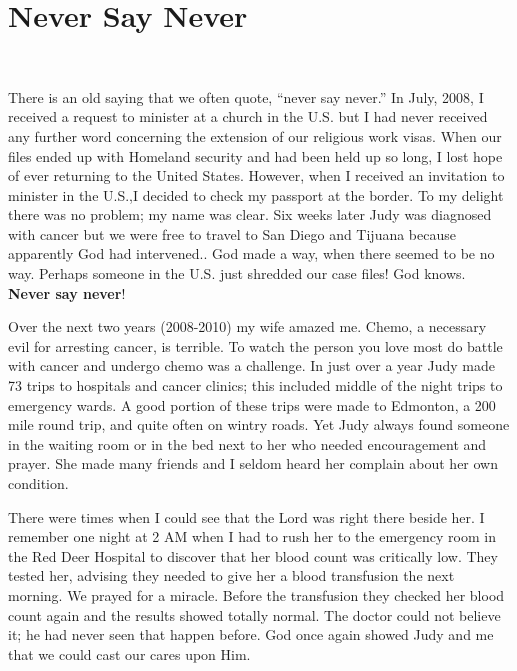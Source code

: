 \documentclass[twoside, 12pt]{book}
\begin{document}
\section{Never Say Never}
\

There is an old saying that we often quote, “never say never.” In July, 2008, I received a request to minister at a church in the U.S. but I had never received any further word concerning the extension of our religious work visas. When our files ended up with Homeland security and had been held up so long, I lost hope of ever returning to the United States. However, when I received an invitation to minister in the U.S.,I decided to check my passport at the border. To my delight there was no problem; my name was clear. Six weeks later Judy was diagnosed with cancer but we were free to travel to San Diego and Tijuana because apparently God had intervened.. God made a way, when there seemed to be no way. Perhaps someone in the U.S. just shredded our case files! God knows. \textbf{Never say never}!

Over the next two years (2008-2010) my wife amazed me. Chemo, a necessary evil for arresting cancer, is terrible. To watch the person you love most do battle with cancer and undergo chemo was a challenge. In just over a year Judy made 73 trips to hospitals and cancer clinics; this included middle of the night trips to emergency wards. A good portion of these trips were made to Edmonton,  a 200 mile round trip, and quite often on wintry roads. Yet Judy always found someone in the waiting room or in the bed next to her who needed encouragement and prayer. She made many friends and I seldom heard her complain about her own condition.

There were times when I could see that the Lord was right there beside her. I remember one night at 2 AM when I had to rush her to the emergency room in the Red Deer Hospital to discover that her blood count was critically low. They tested her, advising they needed to give her a blood transfusion the next morning. We prayed for a miracle. Before the transfusion they checked her blood count again and the results showed totally normal. The doctor could not believe it; he had never seen that happen before. God once again showed Judy and me that we could cast our cares upon Him.
\end{document}
